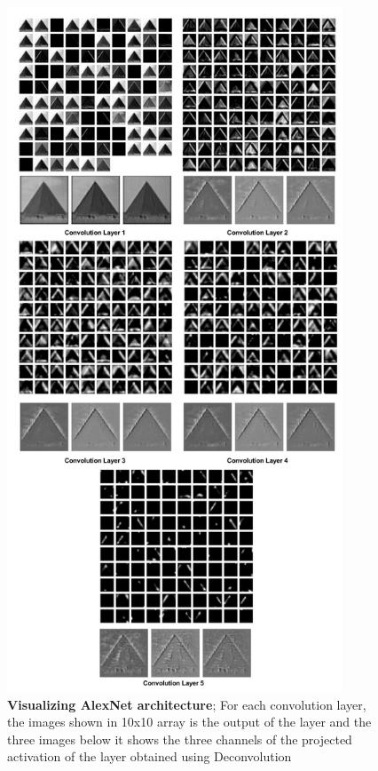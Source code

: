 \documentclass{article} %
\begin{document}
	\begin{figure}[!htb]
		\centering
		\includegraphics[width=10cm]{Images/Alex_Viz}
		\caption{\textbf{Visualizing AlexNet architecture}; For each convolution layer, the images shown in 10x10 array is the output of the layer and the three images below it shows the three channels of the projected activation of the layer obtained using Deconvolution}
	\end{figure}
\end{document}
